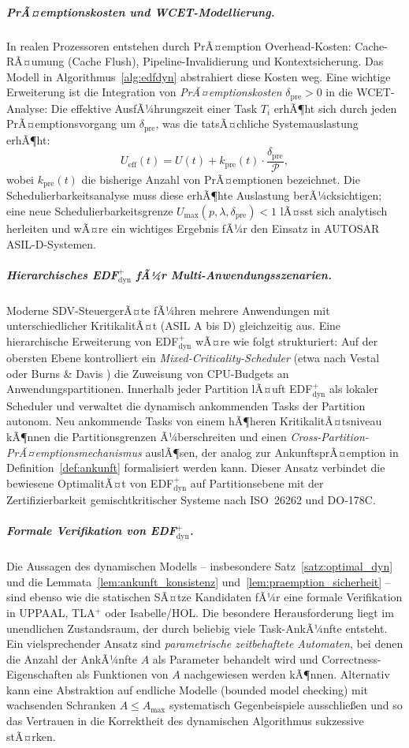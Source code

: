 ﻿\documentclass[a4paper,12pt]{article}
\theoremstyle{definition}
\begin{document}
	\subparagraph{PrÃ¤emptionskosten und WCET-Modellierung.}
	In realen Prozessoren entstehen durch PrÃ¤emption Overhead-Kosten: Cache-RÃ¤umung
	(Cache Flush), Pipeline-Invalidierung und Kontextsicherung. Das Modell in
	Algorithmus~\ref{alg:edfdyn} abstrahiert diese Kosten weg. Eine wichtige Erweiterung
	ist die Integration von \emph{PrÃ¤emptionskosten} $\delta_{\mathrm{pre}} > 0$ in
	die WCET-Analyse: Die effektive AusfÃ¼hrungszeit einer Task $T_i$ erhÃ¶ht sich
	durch jeden PrÃ¤emptionsvorgang um $\delta_{\mathrm{pre}}$, was die tatsÃ¤chliche
	Systemauslastung erhÃ¶ht:
	\[
		U_{\mathrm{eff}}(t) = U(t) + k_{\mathrm{pre}}(t) \cdot \frac{\delta_{\mathrm{pre}}}{\mathcal{P}},
	\]
	wobei $k_{\mathrm{pre}}(t)$ die bisherige Anzahl von PrÃ¤emptionen bezeichnet.
	Die Schedulierbarkeitsanalyse muss diese erhÃ¶hte Auslastung berÃ¼cksichtigen;
	eine neue Schedulierbarkeitsgrenze $U_{\mathrm{max}}(p, \lambda, \delta_{\mathrm{pre}}) < 1$
	lÃ¤sst sich analytisch herleiten und wÃ¤re ein wichtiges Ergebnis fÃ¼r den
	Einsatz in AUTOSAR ASIL-D-Systemen.

	\subparagraph{Hierarchisches EDF$^+_{\mathrm{dyn}}$ fÃ¼r Multi-Anwendungsszenarien.}
	Moderne SDV-Steuer\-gerÃ¤te fÃ¼hren mehrere Anwendungen mit unterschiedlicher
	KritikalitÃ¤t (ASIL A bis D) gleichzeitig aus. Eine hierarchische Erweiterung
	von EDF$^+_{\mathrm{dyn}}$ wÃ¤re wie folgt strukturiert: Auf der obersten Ebene
	kontrolliert ein \emph{Mixed-Criticality-Scheduler} (etwa nach Vestal
	\cite{Vestal2007} oder Burns \& Davis \cite{Burns2013}) die Zuweisung von
	CPU-Budgets an Anwendungspartitionen. Innerhalb jeder Partition lÃ¤uft
	EDF$^+_{\mathrm{dyn}}$ als lokaler Scheduler und verwaltet die dynamisch
	ankommenden Tasks der Partition autonom. Neu ankommende Tasks von einem
	hÃ¶heren KritikalitÃ¤tsniveau kÃ¶nnen die Partitionsgrenzen Ã¼berschreiten
	und einen \emph{Cross-Partition-PrÃ¤emptionsmechanismus} auslÃ¶sen, der analog
	zur AnkunftsprÃ¤emption in Definition~\ref{def:ankunft} formalisiert werden kann.
	Dieser Ansatz verbindet die bewiesene OptimalitÃ¤t von EDF$^+_{\mathrm{dyn}}$
	auf Partitionsebene mit der Zertifizierbarkeit gemischtkritischer Systeme nach
	ISO~26262 und DO-178C.

	\subparagraph{Formale Verifikation von EDF$^+_{\mathrm{dyn}}$.}
	Die Aussagen des dynamischen Modells -- insbesondere Satz~\ref{satz:optimal_dyn}
	und die Lemmata~\ref{lem:ankunft_konsistenz} und~\ref{lem:praemption_sicherheit}
	-- sind ebenso wie die statischen SÃ¤tze Kandidaten fÃ¼r eine formale Verifikation
	in UPPAAL, TLA$^+$ oder Isabelle/HOL. Die besondere Herausforderung liegt im
	unendlichen Zustandsraum, der durch beliebig viele Task-AnkÃ¼nfte entsteht.
	Ein vielsprechender Ansatz sind \emph{parametrische zeitbehaftete Automaten},
	bei denen die Anzahl der AnkÃ¼nfte $A$ als Parameter behandelt wird und
	Correctness-Eigenschaften als Funktionen von $A$ nachgewiesen werden kÃ¶nnen.
	Alternativ kann eine Abstraktion auf endliche Modelle (bounded model checking)
	mit wachsenden Schranken $A \le A_{\max}$ systematisch Gegenbeispiele ausschlie\ss{}en
	und so das Vertrauen in die Korrektheit des dynamischen Algorithmus sukzessive stÃ¤rken.
\end{document}
